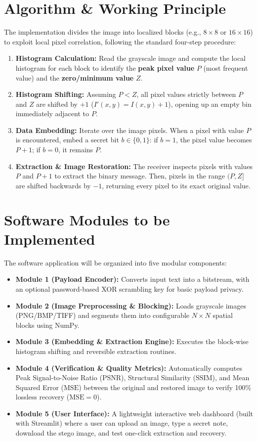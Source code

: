 \documentclass[10pt,a4paper]{article}
\begin{document}
\section{Algorithm \& Working Principle}
The implementation divides the image into localized blocks (e.g., $8 \times 8$ or $16 \times 16$) to exploit local pixel correlation, following the standard four-step procedure:
\begin{enumerate}[leftmargin=1.4em, itemsep=1.5pt, topsep=1pt, parsep=0pt]
    \item \textbf{Histogram Calculation:} Read the grayscale image and compute the local histogram for each block to identify the \textbf{peak pixel value} $P$ (most frequent value) and the \textbf{zero/minimum value} $Z$.
    \item \textbf{Histogram Shifting:} Assuming $P < Z$, all pixel values strictly between $P$ and $Z$ are shifted by $+1$ ($I'(x,y) = I(x,y) + 1$), opening up an empty bin immediately adjacent to $P$.
    \item \textbf{Data Embedding:} Iterate over the image pixels. When a pixel with value $P$ is encountered, embed a secret bit $b \in \{0, 1\}$: if $b = 1$, the pixel value becomes $P+1$; if $b = 0$, it remains $P$.
    \item \textbf{Extraction \& Image Restoration:} The receiver inspects pixels with values $P$ and $P+1$ to extract the binary message. Then, pixels in the range $(P, Z]$ are shifted backwards by $-1$, returning every pixel to its exact original value.
\end{enumerate}

\section{Software Modules to be Implemented}
The software application will be organized into five modular components:
\begin{itemize}[leftmargin=1.2em, itemsep=1.5pt, topsep=1pt, parsep=0pt]
    \item \textbf{Module 1 (Payload Encoder):} Converts input text into a bitstream, with an optional password-based XOR scrambling key for basic payload privacy.
    \item \textbf{Module 2 (Image Preprocessing \& Blocking):} Loads grayscale images (PNG/BMP/TIFF) and segments them into configurable $N \times N$ spatial blocks using NumPy.
    \item \textbf{Module 3 (Embedding \& Extraction Engine):} Executes the block-wise histogram shifting and reversible extraction routines.
    \item \textbf{Module 4 (Verification \& Quality Metrics):} Automatically computes Peak Signal-to-Noise Ratio ($\text{PSNR}$), Structural Similarity ($\text{SSIM}$), and Mean Squared Error ($\text{MSE}$) between the original and restored image to verify 100\% lossless recovery ($\text{MSE} = 0$).
    \item \textbf{Module 5 (User Interface):} A lightweight interactive web dashboard (built with Streamlit) where a user can upload an image, type a secret note, download the stego image, and test one-click extraction and recovery.
\end{itemize}
\end{document}
